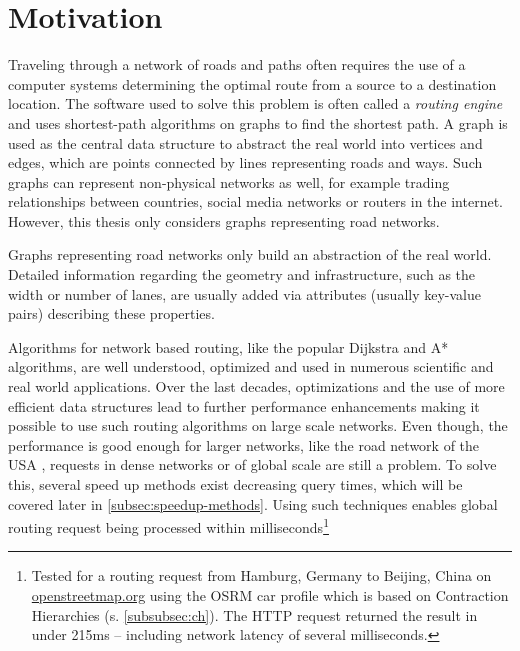 
\section{Motivation}
	
	Traveling through a network of roads and paths often requires the use of a computer systems determining the optimal route from a source to a destination location.
	The software used to solve this problem is often called a \emph{routing engine} and uses shortest-path algorithms on graphs to find the shortest path.
	A graph is used as the central data structure to abstract the real world into vertices and edges, which are points connected by lines representing roads and ways.
	Such graphs can represent non-physical networks as well, for example trading relationships between countries, social media networks or routers in the internet.
	However, this thesis only considers graphs representing road networks.
	
	Graphs representing road networks only build an abstraction of the real world.
	Detailed information regarding the geometry and infrastructure, such as the width or number of lanes, are usually added via attributes (usually key-value pairs) describing these properties.
	
	Algorithms for network based routing, like the popular Dijkstra and A* algorithms, are well understood, optimized and used in numerous scientific and real world applications.
	Over the last decades, optimizations and the use of more efficient data structures lead to further performance enhancements making it possible to use such routing algorithms on large scale networks.
	Even though, the performance is good enough for larger networks, like the road network of the USA \cite{aviram-optimizing-dijkstra}, requests in dense networks or of global scale are still a problem.
	To solve this, several speed up methods exist decreasing query times, which will be covered later in \cref{subsec:speedup-methods}.
	Using such techniques enables global routing request being processed within milliseconds\footnote{Tested for a routing request from Hamburg, Germany to Beijing, China on \href{https://www.openstreetmap.org/directions?engine=fossgis\_osrm\_car&route=53.55\%2C10.00\%3B39.91\%2C116.39}{openstreetmap.org} using the OSRM car profile which is based on Contraction Hierarchies (s. \cref{subsubsec:ch}). The HTTP request returned the result in under 215ms -- including network latency of several milliseconds.}
	
